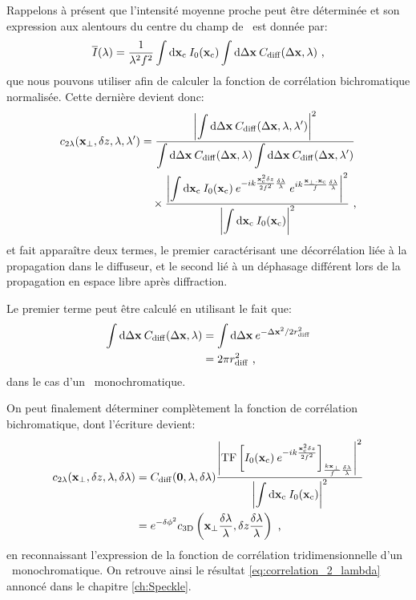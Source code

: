 Rappelons à présent que l'intensité moyenne proche peut être déterminée et son expression aux alentours du centre du champ de \speckle\ est donnée par:
\begin{equation}
\overline{I}(\lambda)= \frac{1}{\lambda^2 f^2} \int{\mathop{}\mathopen{}\mathrm{d}\mathbf{x}_{\mathrm{c}}\: I_0(\mathbf{x}_{\mathrm{c}})} \int{\mathop{}\mathopen{}\mathrm{d}\Delta\mathbf{x}\: C_{\mathrm{diff}}(\Delta\mathbf{x},\lambda)} \text{ ,}
\end{equation}
que nous pouvons utiliser afin de calculer la fonction de corrélation bichromatique normalisée. Cette dernière devient donc:
\begin{align}
c_{2\lambda}(\mathbf{x}_{\perp},\delta z,\lambda,\lambda') &= \frac{\left| \displaystyle\int{\mathop{}\mathopen{}\mathrm{d}\Delta\mathbf{x}\: C_{\mathrm{diff}}(\Delta\mathbf{x},\lambda,\lambda')}\right|^2}{\displaystyle\int{\mathop{}\mathopen{}\mathrm{d}\Delta\mathbf{x}\: C_{\mathrm{diff}}(\Delta\mathbf{x},\lambda)}\displaystyle\int{\mathop{}\mathopen{}\mathrm{d}\Delta\mathbf{x}\: C_{\mathrm{diff}}(\Delta\mathbf{x},\lambda')}} \\
&\nonumber \quad\times \frac{\left|\displaystyle\int{\mathop{}\mathopen{}\mathrm{d}\mathbf{x}_{\mathrm{c}}\: I_0(\mathbf{x}_{\mathrm{c}}) \: e^{-ik \frac{\mathbf{x}_{\mathrm{c}}^2 \delta z}{2f^2} \frac{\delta\lambda}{\lambda}} \: e^{ik\frac{\mathbf{x}_{\perp}.\mathbf{x}_{\mathrm{c}}}{f} \frac{\delta\lambda}{\lambda}}} \right|^2}{\left|\displaystyle\int{\mathop{}\mathopen{}\mathrm{d}\mathbf{x}_{\mathrm{c}}\: I_0(\mathbf{x}_{\mathrm{c}})} \right|^2} \text{ ,}
\end{align}
et fait apparaître deux termes, le premier caractérisant une décorrélation liée à la propagation dans le diffuseur, et le second lié à un déphasage différent lors de la propagation en espace libre après diffraction.

Le premier terme peut être calculé en utilisant le fait que:
\begin{align}
\int{\mathop{}\mathopen{}\mathrm{d}\Delta\mathbf{x}\: C_{\mathrm{diff}}(\Delta\mathbf{x},\lambda)} &= \int{\mathop{}\mathopen{}\mathrm{d}\Delta\mathbf{x}\: e^{-\Delta\mathbf{x}^2/2r_{\mathrm{diff}}^2}} \\
&= 2\pi r_{\mathrm{diff}}^2 \text{ ,}
\end{align}
dans le cas d'un \speckle\ monochromatique.

On peut finalement déterminer complètement la fonction de corrélation bichromatique, dont l'écriture devient:
\begin{align}
c_{2\lambda}(\mathbf{x}_{\perp},\delta z,\lambda,\delta\lambda) &= C_{\mathrm{diff}}(\mathbf{0},\lambda,\delta\lambda) \frac{\left| \mathrm{TF} \left[ I_0(\mathbf{x}_{\mathrm{c}}) \: e^{-ik\frac{\mathbf{x}_{\mathrm{c}}^2 \delta z}{2f^2}}\right]_{\frac{k\mathbf{x}_{\perp}}{f} \frac{\delta\lambda}{\lambda}}\right|^2}{\left|\displaystyle\int{\mathop{}\mathopen{}\mathrm{d}\mathbf{x}_{\mathrm{c}}\: I_0(\mathbf{x}_{\mathrm{c}})} \right|^2}\\
&= e^{-\delta\phi^2} c_{\mathrm{3D}}\left(\mathbf{x}_{\perp} \frac{\delta\lambda}{\lambda}, \delta z \frac{\delta\lambda}{\lambda}\right) \text{ ,}
\end{align}
en reconnaissant l'expression de la fonction de corrélation tridimensionnelle d'un \speckle\ monochromatique. On retrouve ainsi le résultat \ref{eq:correlation_2_lambda} annoncé dans le chapitre \ref{ch:Speckle}.



